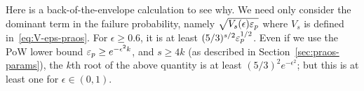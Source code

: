 % 





Here is a back-of-the-envelope calculation to see why. 
We need only consider the dominant term in the failure probability, 
namely $\sqrt{V_s(\epsilon) \mathsf{\varepsilon}_p}$ where $V_s$ is defined in~\eqref{eq:V-eps-praos}. 
For $\epsilon \geq 0.6$, it is at least $(5/3)^{s/2} \mathsf{\varepsilon}_p^{1/2}$. 
Even if we use the PoW lower bound $\mathsf{\varepsilon}_p \geq e^{-\epsilon^2 k}$,\cite{PoWLowerBound} 
and $s \geq 4 k$ (as described in Section~\ref{sec:praos-params}),
the $k$th root of the above quantity 
is at least $(5/3)^2 e^{-\epsilon^2}$; 
but this is at least one for $\epsilon \in (0,1)$.

